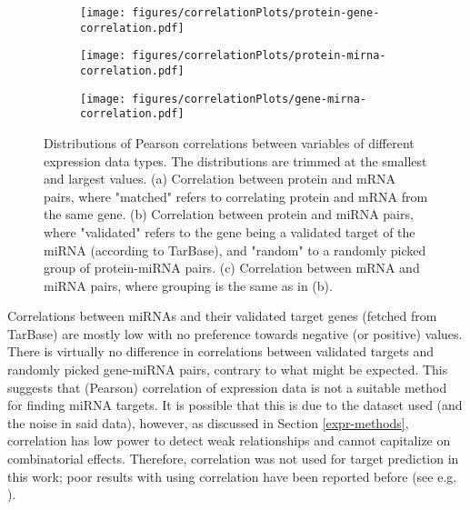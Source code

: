 \begin{figure}[!h]
  \centering
  \begin{subfigure}{.45\textwidth}
    \centering
    \texttt{[image: figures/correlationPlots/protein-gene-correlation.pdf]}
    \subcaption{ \label{fig:protein-gene-cor}}
  \end{subfigure}
  \begin{subfigure}{.45\textwidth}
    \centering
    \texttt{[image: figures/correlationPlots/protein-mirna-correlation.pdf]}
    \subcaption{ \label{fig:protein-mirna-cor}}
  \end{subfigure}
  \begin{subfigure}{.45\textwidth}
    \texttt{[image: figures/correlationPlots/gene-mirna-correlation.pdf]}
    \subcaption{ \label{fig:gene-mirna-cor}}
  \end{subfigure}

  \caption{Distributions of Pearson correlations between variables of different expression data types.
  The distributions are trimmed at the smallest and largest values.
  (a) Correlation between protein and mRNA pairs, where "matched" refers to correlating
  protein and mRNA from the same gene.
  (b) Correlation between protein and miRNA pairs, where "validated" refers to the gene
  being a validated target of the miRNA (according to TarBase),
  and "random" to a randomly picked group of protein-miRNA pairs.
  (c) Correlation between mRNA and miRNA pairs,
  where grouping is the same as in (b).}
  \label{fig:correlations}
\end{figure}

Correlations between miRNAs and their validated target genes (fetched from
TarBase) are mostly low with no preference towards negative (or positive)
values. There is virtually no difference in correlations between validated
targets and randomly picked gene-miRNA pairs, contrary to what might be
expected. This suggests that (Pearson) correlation of expression data is not a
suitable method for finding miRNA targets. It is possible that this is due to
the dataset used (and the noise in said data), however, as discussed in
Section \ref{expr-methods}, correlation has low power to detect weak
relationships and cannot capitalize on combinatorial effects. Therefore,
correlation was not used for target prediction in this work; poor
results with using correlation have been reported before
(see e.g. \citep{Muniategui2012}).




